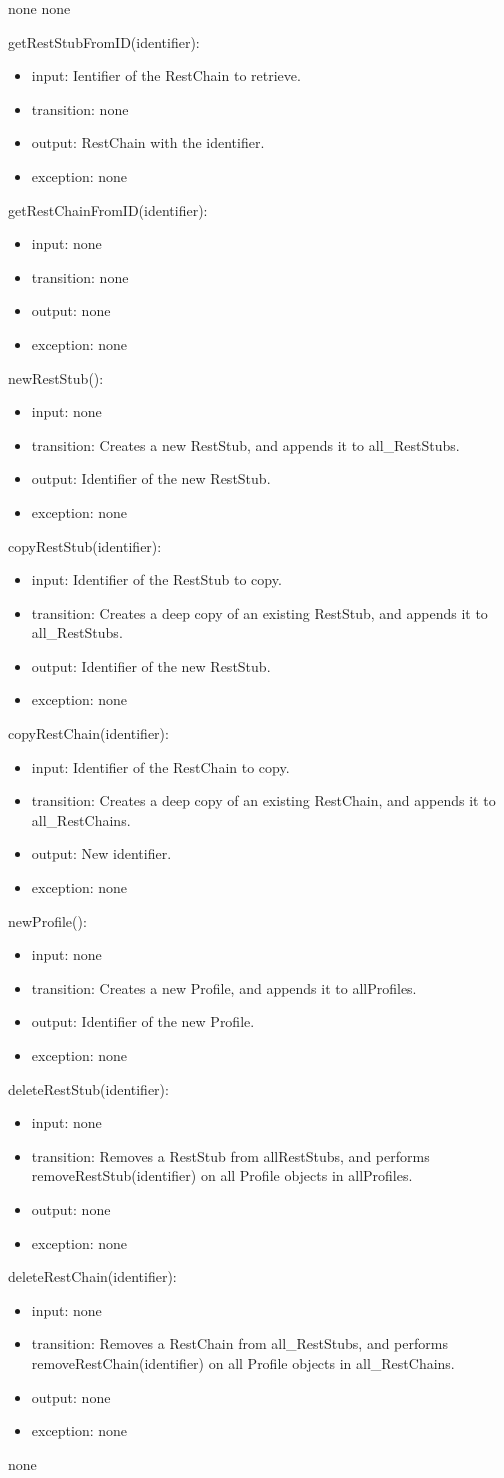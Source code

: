 \documentclass[12pt, titlepage]{article}
\newcommand{\newAccessProgram}[5]{
	\noindent #1:
		\begin{itemize}
		    \item input: #2
			\item transition: #3
			\item output: #4
			\item exception: #5
		\end{itemize}
}
\begin{document}
	{%
        none
	}
	{%
		none
	}
	{%
		\newAccessProgram{getRestStubFromID(identifier)}
			{%
				Ientifier of the RestChain to retrieve.
			}
			{%
				none
			}
			{%
				RestChain with the identifier.
			}
			{%
				none
			}
			
		\newAccessProgram{getRestChainFromID(identifier)}
			{%
				none
			}
			{%
				none
			}
			{%
				none
			}
			{%
				none
			}
		\newAccessProgram{newRestStub()}
			{%
				none
			}
			{%
				Creates a new RestStub, and appends it to all\_RestStubs.
			}
			{%
				Identifier of the new RestStub.
			}
			{%
				none
			}
		\newAccessProgram{copyRestStub(identifier)}
			{%
				Identifier of the RestStub to copy.
			}
			{%
				Creates a deep copy of an existing RestStub, and appends it to all\_RestStubs.
			}
			{%
				Identifier of the new RestStub.
			}
			{%
				none
			}
			\newAccessProgram{copyRestChain(identifier)}
			{%
				Identifier of the RestChain to copy.
			}
			{%
				Creates a deep copy of an existing RestChain, and appends it to all\_RestChains.
			}
			{%
				New identifier.
			}
			{%
				none
			}
		\newAccessProgram{newProfile()}
			{%
				none
			}
			{%
				Creates a new Profile, and appends it to allProfiles.
			}
			{%
				Identifier of the new Profile.
			}
			{%
				none
			}
		\newAccessProgram{deleteRestStub(identifier)}
			{%
				none
			}
			{%
				Removes a RestStub from allRestStubs, and performs removeRestStub(identifier) on all Profile objects in allProfiles.
			}
			{%
				none
			}
			{%
				none
			}
		\newAccessProgram{deleteRestChain(identifier)}
			{%
				none
			}
			{%
				 Removes a RestChain from all\_RestStubs, and performs removeRestChain(identifier) on all Profile objects in all\_RestChains.
			}
			{%
				none
			}
			{%
				none
			}
	}
	{%
		none
	}
	
\end{document}
